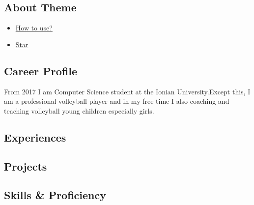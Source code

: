 \documentclass[
]{article}
\providecommand{\tightlist}{%
  \setlength{\itemsep}{0pt}\setlength{\parskip}{0pt}}
\begin{document}
\hypertarget{about-theme}{%
\subsection{About Theme}\label{about-theme}}

\begin{itemize}
\tightlist
\item
  \href{https://www.youtube.com/watch?v=Jnmj1dXDbNk}{How to use?}
\item
  \href{https://github.com/sharu725/online-cv}{Star}
\end{itemize}

\hypertarget{career-profile}{%
\subsection{\texorpdfstring{{ \emph{} \emph{} } Career
Profile}{    Career Profile}}\label{career-profile}}

From 2017 I am Computer Science student at the Ionian University.Except
this, I am a professional volleyball player and in my free time I also
coaching and teaching volleyball young children especially girls.

\hypertarget{experiences}{%
\subsection{\texorpdfstring{{ \emph{} \emph{} }
Experiences}{    Experiences}}\label{experiences}}

\hypertarget{section}{%
\subsubsection{}\label{section}}

\hypertarget{section-1}{%
\subsubsection{}\label{section-1}}

\hypertarget{projects}{%
\subsection{\texorpdfstring{{ \emph{} \emph{} }
Projects}{    Projects}}\label{projects}}

\hypertarget{skills-proficiency}{%
\subsection{\texorpdfstring{{ \emph{} \emph{} } Skills \&
Proficiency}{    Skills \& Proficiency}}\label{skills-proficiency}}
\end{document}
